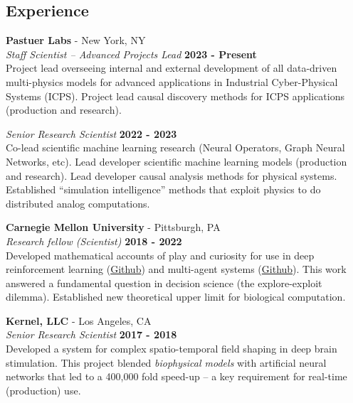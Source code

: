 \documentclass[margin,line]{res}
\begin{document}
\begin{resume}
\section{\sc Experience}
\vspace{-.1cm}
{\bf Pastuer Labs} - New York, NY\\
{\em Staff Scientist -- Advanced Projects Lead} \hfill {\bf 2023 - Present}\\
Project lead overseeing internal and external development of all data-driven multi-physics models for advanced applications in Industrial Cyber-Physical Systems (ICPS). Project lead causal discovery methods for ICPS applications (production and research).

\vspace{-.2cm}
{\em Senior Research Scientist} \hfill {\bf 2022 - 2023}\\
Co-lead scientific machine learning research (Neural Operators, Graph Neural Networks, etc). Lead developer scientific machine learning models (production and research). Lead developer causal analysis methods for physical systems. Established “simulation intelligence” methods that exploit physics to do distributed analog computations.

\vspace{-.1cm}
{\bf Carnegie Mellon University} - Pittsburgh, PA \\
{\em Research fellow (Scientist)} \hfill {\bf 2018 - 2022}\\
Developed mathematical accounts of play and curiosity for use in deep reinforcement learning (\href{https://github.com/CoAxLab/infomercial}{Github}) and multi-agent systems (\href{https://github.com/parenthetical-e/parkid}{Github}). This work answered a fundamental question in decision science (the explore-exploit dilemma). Established new theoretical upper limit for biological computation.

\vspace{-.1cm}
{\bf Kernel, LLC} - Los Angeles, CA\\
{\em Senior Research Scientist} \hfill {\bf 2017 - 2018}\\
Developed a system for complex spatio-temporal field shaping in deep brain stimulation. This project blended \textit{biophysical models} with artificial neural networks that led to a 400,000 fold speed-up -- a key requirement for real-time (production) use.


\end{resume}
\end{document}
